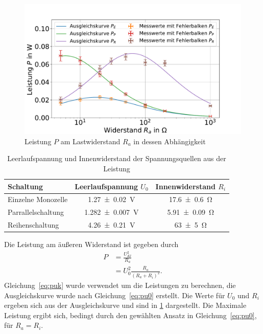 \FloatBarrier

\begin{figure}[h]
	\centering
	\includegraphics[width=0.9\linewidth]{"auswertung/Auswertung Innenwiderstand/Batterie Gesamt P"}
	\caption{Leistung $P$ am Lastwiderstand $R_a$ in dessen Abhängigkeit}
	\label{fig:batt-ges-p}
\end{figure}



\begin{table}
	\caption{Leerlaufspannung und Innenwiderstand der Spannungsquellen aus der Leistung}
	\centering
	\begin{tabular}{|l||c|c|}
		\hline 
		Schaltung & Leerlaufspannung $U_0$ & Innenwiderstand $R_i$ \\ 
		\hline \hline
		Einzelne Monozelle	& \SI{1.27+-0.02}{V}  & \SI{17.6+-0.6}{\ohm } \\ 
		\hline  
		Parrallelschaltung	& \SI{1.282+-0.007}{V } &\SI{5.91+-0.09}{\ohm }  \\ 
		\hline   
		Reihenschaltung	& \SI{4.26+-0.21}{V } &\SI{63+-5}{\ohm }  \\ 
		\hline 
	\end{tabular} 
	
	\label{tab:batt-U-P}
	
\end{table}


Die Leistung am äußeren Widerstand ist gegeben durch 
\begin{align}
 P &=\frac{U_{Kl}^2}{R_a} \label{eq:puk}\\
 &= U_0^2 \frac{R_a}{(R_a+R_i)^2} \label{eq:pu0}.
\end{align} 
Gleichung~\ref{eq:puk} wurde verwendet um die Leistungen zu berechnen, die Ausgleichskurve wurde nach Gleichung~\ref{eq:pu0} erstellt.
Die Werte für $U_0$ und $R_i$ ergeben sich aus der Ausgleichskurve und sind in \cref{tab:batt-U-P} dargestellt. Die Maximale Leistung ergibt sich, bedingt durch den gewählten Ansatz in Gleichung~\ref{eq:pu0}, für $R_a=R_i$. 






